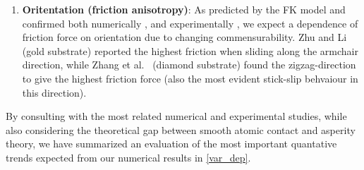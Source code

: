 \begin{enumerate}
  

  \item \textbf{Oritentation (friction anisotropy)}: As predicted by the FK model and confirmed both numerically \cite{zhu_study_2018}, \cite{ma12091425} and experimentally \cite{DIENWIEBEL2005197}, \cite{feng_superlubric_2013} we expect a dependence of friction force on orientation due to changing commensurability. Zhu and Li \cite{zhu_study_2018} (gold substrate) reported the highest friction when sliding along the armchair direction, while Zhang et al.\ \cite{ma12091425} (diamond substrate) found the zigzag-direction to give the highest friction force (also the most evident stick-slip behvaiour in this direction). 
\end{enumerate}


By consulting with the most related numerical and experimental studies, while also considering the theoretical gap between smooth atomic contact and asperity theory, we have summarized an evaluation of the most important quantative trends expected from our numerical results in \cref{var_dep}. 



